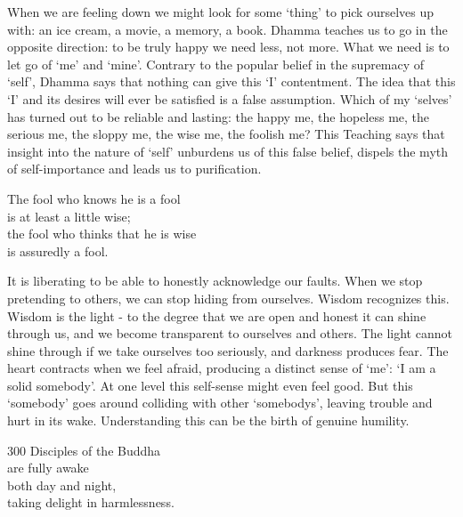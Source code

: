 \begin{dhpRefl}
When we are feeling down we might look for some `thing' to pick ourselves up with: an ice cream, a movie, a memory, a book. Dhamma teaches us to go in the opposite direction: to be truly happy we need less, not more. What we need is to let go of `me' and `mine'. Contrary to the popular belief in the supremacy of `self', Dhamma says that nothing can give this `I' contentment. The idea that this `I' and its desires will ever be satisfied is a false assumption. Which of my `selves' has turned out to be reliable and lasting: the happy me, the hopeless me, the serious me, the sloppy me, the wise me, the foolish me? This Teaching says that insight into the nature of `self' unburdens us of this false belief, dispels the myth of self-importance and leads us to purification.
\end{dhpRefl}


\begin{dhpVerse}{63}
\label{dhp-63}
The fool who knows he is a fool\\
is at least a little wise;\\
the fool who thinks that he is wise\\
is assuredly a fool.
\end{dhpVerse}

\begin{dhpRefl}
It is liberating to be able to honestly acknowledge our faults. When we stop pretending to others, we can stop hiding from ourselves. Wisdom recognizes this. Wisdom is the light - to the degree that we are open and honest it can shine through us, and we become transparent to ourselves and others. The light cannot shine through if we take ourselves too seriously, and darkness produces fear. The heart contracts when we feel afraid, producing a distinct sense of `me': `I am a solid somebody'. At one level this self-sense might even feel good. But this `somebody' goes around colliding with other `somebodys', leaving trouble and hurt in its wake. Understanding this can be the birth of genuine humility.
\end{dhpRefl}


\begin{dhpVerse}{300}
\label{dhp-300}
Disciples of the Buddha\\
are fully awake\\
both day and night,\\
taking delight in harmlessness.
\end{dhpVerse}

